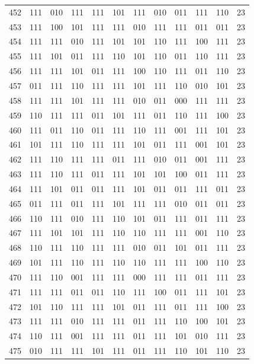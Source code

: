 \begin{longtable}{r*{10}{c}r}
452 & 111 & 010 & 111 & 111 & 101 & 111 & 010 & 011 & 111 & 110 & 23\\
453 & 111 & 100 & 101 & 111 & 111 & 010 & 111 & 111 & 011 & 011 & 23\\
454 & 111 & 111 & 010 & 111 & 101 & 101 & 110 & 111 & 100 & 111 & 23\\
455 & 111 & 101 & 011 & 111 & 110 & 101 & 110 & 011 & 110 & 111 & 23\\
456 & 111 & 111 & 101 & 011 & 111 & 100 & 110 & 111 & 011 & 110 & 23\\
457 & 011 & 111 & 110 & 111 & 111 & 101 & 111 & 110 & 010 & 101 & 23\\
458 & 111 & 111 & 101 & 111 & 111 & 010 & 011 & 000 & 111 & 111 & 23\\
459 & 110 & 111 & 111 & 011 & 101 & 111 & 011 & 110 & 111 & 100 & 23\\
460 & 111 & 011 & 110 & 011 & 111 & 110 & 111 & 001 & 111 & 101 & 23\\
461 & 101 & 111 & 110 & 111 & 111 & 101 & 011 & 111 & 001 & 101 & 23\\
462 & 111 & 110 & 111 & 111 & 011 & 111 & 010 & 011 & 001 & 111 & 23\\
463 & 111 & 110 & 111 & 011 & 111 & 101 & 101 & 100 & 011 & 111 & 23\\
464 & 111 & 101 & 011 & 011 & 111 & 101 & 011 & 011 & 111 & 011 & 23\\
465 & 011 & 111 & 011 & 111 & 101 & 111 & 111 & 010 & 011 & 011 & 23\\
466 & 110 & 111 & 010 & 111 & 110 & 101 & 011 & 111 & 011 & 111 & 23\\
467 & 111 & 101 & 101 & 111 & 110 & 110 & 111 & 111 & 001 & 110 & 23\\
468 & 110 & 111 & 110 & 111 & 111 & 010 & 011 & 101 & 011 & 111 & 23\\
469 & 101 & 111 & 110 & 111 & 110 & 110 & 111 & 111 & 100 & 110 & 23\\
470 & 111 & 110 & 001 & 111 & 111 & 000 & 111 & 111 & 011 & 111 & 23\\
471 & 111 & 111 & 011 & 011 & 110 & 111 & 100 & 011 & 111 & 101 & 23\\
472 & 101 & 110 & 111 & 111 & 101 & 011 & 111 & 011 & 111 & 100 & 23\\
473 & 111 & 111 & 010 & 111 & 111 & 011 & 111 & 110 & 100 & 101 & 23\\
474 & 110 & 111 & 001 & 111 & 111 & 011 & 111 & 101 & 010 & 111 & 23\\
475 & 010 & 111 & 111 & 101 & 111 & 011 & 111 & 110 & 101 & 110 & 23\\

\end{longtable}
